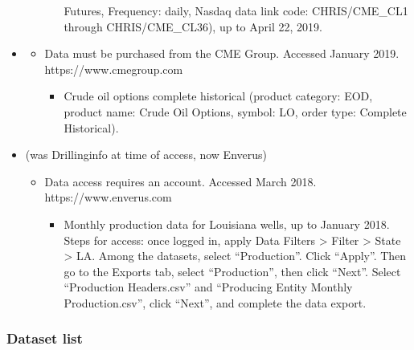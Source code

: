 \documentclass[12pt,english]{article}
\begin{document}
\begin{itemize}
\begin{itemize}
\begin{itemize}
				Futures, Frequency: daily, Nasdaq data link code: CHRIS/CME\_CL1 through
				CHRIS/CME\_CL36), up to April 22, 2019. 
			\end{itemize}
		\end{itemize}
		\item \citet{cme} %
		\begin{itemize}
			\item Data must be purchased from the CME Group. Accessed January 2019.\\
			https://www.cmegroup.com
			\begin{itemize}
				\item Crude oil options complete historical (product category: EOD, product
				name: Crude Oil Options, symbol: LO, order type: Complete Historical).
			\end{itemize}
		\end{itemize}
		\item \citet{drillinginfo} (was Drillinginfo at time of access, now Enverus)
		\begin{itemize}
			\item Data access requires an account. Accessed March 2018.\\
			https://www.enverus.com
			\begin{itemize}
				\item Monthly production data for Louisiana wells, up to January 2018. Steps
				for access: once logged in, apply Data Filters > Filter > State >
				LA. Among the datasets, select ``Production''. Click ``Apply''.
				Then go to the Exports tab, select ``Production'', then click ``Next''.
				Select ``Production Headers.csv'' and ``Producing Entity Monthly
				Production.csv'', click ``Next'', and complete the data export.
			\end{itemize}
		\end{itemize}
	\end{itemize}
	
	\subsubsection*{Dataset list}
	
\end{document}
